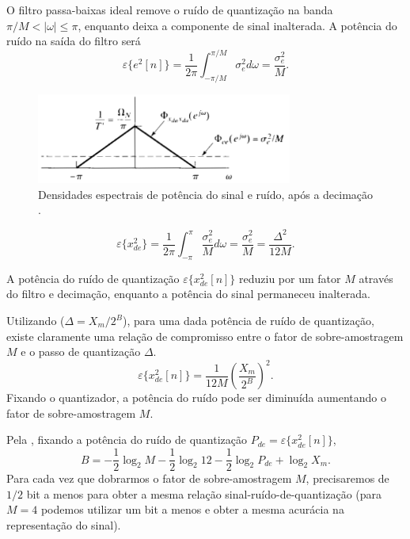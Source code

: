 \begin{frame}[allowframebreaks]
  \framebreak

  O filtro passa-baixas ideal remove o ruído de quantização na banda  $\pi/M < |\omega| \le \pi$,
  enquanto deixa a componente de sinal inalterada.
  A potência do ruído na saída do filtro será
  \begin{equation}
  \varepsilon\{ e^2[n] \} = \frac{1}{2\pi} \int_{-\pi/M}^{\pi/M} \sigma_e^2 d\omega = \frac{\sigma_e^2}{M} .
  \end{equation}

  \framebreak

  \begin{figure}[h!]
  \centering
  \includegraphics[width=0.75\textwidth]{images/oppenheim_fig460.png}
  \caption{Densidades espectrais de potência do sinal e ruído, após a decimação \citep{oppenheim2009}.}
  \label{fig:oppenheim_fig460}
  \end{figure}

  \begin{equation}
  \label{eq-qn-power-xde}
  \varepsilon\{ x^2_{de} \} = \frac{1}{2\pi} \int_{-\pi}^{\pi} \frac{\sigma_e^2}{M} d\omega = \frac{\sigma_e^2}{M} = \frac{\Delta^2}{12 M} .
  \end{equation}

  A potência do ruído de quantização $\varepsilon\{ x^2_{de} [n]\}$ reduziu por um fator $M$
  através do filtro e decimação, enquanto a potência do sinal permaneceu inalterada.

  \framebreak

  Utilizando  ($\Delta = X_m/2^B$),
  para uma dada potência de ruído de quantização, existe claramente uma relação
  de compromisso entre o fator de sobre-amostragem $M$ e o passo de quantização $\Delta$.
  \begin{equation}
  \label{eq-pne-MB}
  \varepsilon\{ x^2_{de} [n]\} = \frac{1}{12M} \left( \frac{X_m}{2^B} \right)^2 .
  \end{equation}
  Fixando o quantizador, a potência do ruído pode ser diminuída aumentando o fator de sobre-amostragem $M$.

  \framebreak

  Pela , fixando a potência do ruído de quantização $P_{de} = \varepsilon \{ x^2_{de} [n]\}$,
  \begin{equation}
  B = - \frac{1}{2} \log_2 M - \frac{1}{2} \log_2 12 - \frac{1}{2} \log_2 P_{de} + \log_2 X_m .
  \end{equation}
  Para cada vez que dobrarmos o fator de sobre-amostragem $M$, precisaremos de $1/2$ bit a menos
  para obter a mesma relação sinal-ruído-de-quantização 
  (para $M=4$ podemos utilizar um bit a menos e obter a mesma acurácia na representação do sinal).
\end{frame}

